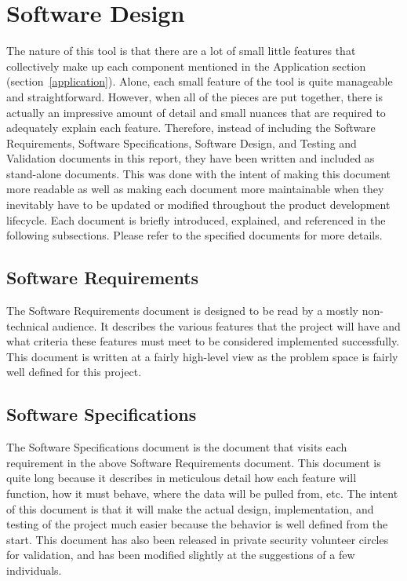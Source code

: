 \documentclass[letterpaper,12pt]{article}
\begin{document}
\section{Software Design}
The nature of this tool is that there are a lot of small little features that
collectively make up each component mentioned in the Application section
(section~\ref{application}).  Alone, each small feature of the tool is quite
manageable and straightforward.  However, when all of the pieces are put
together, there is actually an impressive amount of detail and small nuances
that are required to adequately explain each feature.  Therefore, instead of
including the Software Requirements, Software Specifications, Software Design,
and Testing and Validation documents in this report, they have been written and
included as stand-alone documents.  This was done with the intent of making this
document more readable as well as making each document more maintainable when
they inevitably have to be updated or modified throughout the product
development lifecycle.  Each document is briefly introduced, explained, and
referenced in the following subsections.  Please refer to the specified
documents for more details.

\subsection{Software Requirements}
\label{software_requirements}
The Software Requirements document \cite{Requirements} is designed to be read by
a mostly non-technical audience.  It describes the various features that the
project will have and what criteria these features must meet to be considered
implemented successfully.  This document is written at a fairly high-level view
as the problem space is fairly well defined for this project.

\subsection{Software Specifications}
\label{software_specifications}
The Software Specifications document \cite{Specification} is the document that
visits each requirement in the above Software Requirements document.  This
document is quite long because it describes in meticulous detail how each
feature will function, how it must behave, where the data will be pulled from,
etc.  The intent of this document is that it will make the actual design,
implementation, and testing of the project much easier because the behavior is
well defined from the start.  This document has also been released in private
security volunteer circles for validation, and has been modified slightly at the
suggestions of a few individuals.  
\end{document}
